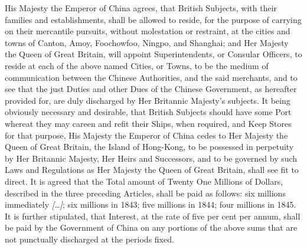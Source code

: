 \begin{fancyquote}
	\vspace*{0.5em}
	\vspace*{0.5em}
	His Majesty the Emperor of China agrees, that British Subjects, with their families and establishments, shall be allowed to reside, for the purpose of carrying on their mercantile pursuits, without molestation or restraint, at the cities and towns of Canton, Amoy, Foochowfoo, Ningpo, and Shanghai; and Her Majesty the Queen of Great Britain, will appoint Superintendents, or Consular Officers, to reside at each of the above named Cities, or Towns, to be the medium of communication between the Chinese Authorities, and the said merchants, and to see that the just Duties and other Dues of the Chinese Government, as hereafter provided for, are duly discharged by Her Britannic Majesty's subjects.
	It being obviously necessary and desirable, that British Subjects should have some Port whereat they may careen and refit their Ships, when required, and Keep Stores for that purpose, His Majesty the Emperor of China cedes to Her Majesty the Queen of Great Britain, the Island of Hong-Kong, to be possessed in perpetuity by Her Britannic Majesty, Her Heirs and Successors, and to be governed by such Laws and Regulations as Her Majesty the Queen of Great Britain, shall see fit to direct.
	It is agreed that the Total amount of Twenty One Millions of Dollars, described in the three preceding Articles, shall be paid as follows: six millions immediately \emph{[\ldots]}; six millions in 1843; five millions in 1844; four millions in 1845. It is further stipulated, that Interest, at the rate of five per cent per annum, shall be paid by the Government of China on any portions of the above sums that are not punctually discharged at the periods fixed.
	\begin{flushright}
		\emph{\autocite{Mayers:1902}}
	\end{flushright}
\end{fancyquote}
